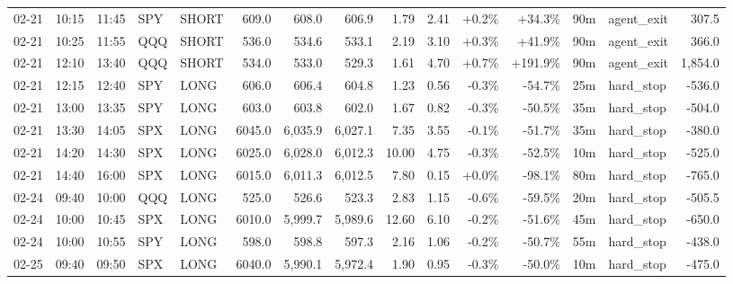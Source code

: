 \documentclass[11pt,a4paper,twoside]{article}
\begin{document}
\begin{landscape}
\begin{center}
\begin{longtable}{>{\color{txtmain}}l l l l l r r r r r r r r >{\color{txtmain}}l r}
02-21 & 10:15 & 11:45 & SPY & SHORT & 609.0 & 608.0 & 606.9 & 1.79 & 2.41 & \textcolor{wingreen}{+0.2\%} & \textcolor{wingreen}{+34.3\%} & 90m & agent\_exit & \textcolor{wingreen}{307.5} \\
02-21 & 10:25 & 11:55 & QQQ & SHORT & 536.0 & 534.6 & 533.1 & 2.19 & 3.10 & \textcolor{wingreen}{+0.3\%} & \textcolor{wingreen}{+41.9\%} & 90m & agent\_exit & \textcolor{wingreen}{366.0} \\
02-21 & 12:10 & 13:40 & QQQ & SHORT & 534.0 & 533.0 & 529.3 & 1.61 & 4.70 & \textcolor{wingreen}{+0.7\%} & \textcolor{wingreen}{+191.9\%} & 90m & agent\_exit & \textcolor{wingreen}{1,854.0} \\
02-21 & 12:15 & 12:40 & SPY & LONG & 606.0 & 606.4 & 604.8 & 1.23 & 0.56 & \textcolor{lossred}{-0.3\%} & \textcolor{lossred}{-54.7\%} & 25m & hard\_stop & \textcolor{lossred}{-536.0} \\
02-21 & 13:00 & 13:35 & SPY & LONG & 603.0 & 603.8 & 602.0 & 1.67 & 0.82 & \textcolor{lossred}{-0.3\%} & \textcolor{lossred}{-50.5\%} & 35m & hard\_stop & \textcolor{lossred}{-504.0} \\
02-21 & 13:30 & 14:05 & SPX & LONG & 6045.0 & 6,035.9 & 6,027.1 & 7.35 & 3.55 & \textcolor{lossred}{-0.1\%} & \textcolor{lossred}{-51.7\%} & 35m & hard\_stop & \textcolor{lossred}{-380.0} \\
02-21 & 14:20 & 14:30 & SPX & LONG & 6025.0 & 6,028.0 & 6,012.3 & 10.00 & 4.75 & \textcolor{lossred}{-0.3\%} & \textcolor{lossred}{-52.5\%} & 10m & hard\_stop & \textcolor{lossred}{-525.0} \\
02-21 & 14:40 & 16:00 & SPX & LONG & 6015.0 & 6,011.3 & 6,012.5 & 7.80 & 0.15 & \textcolor{wingreen}{+0.0\%} & \textcolor{lossred}{-98.1\%} & 80m & hard\_stop & \textcolor{lossred}{-765.0} \\
02-24 & 09:40 & 10:00 & QQQ & LONG & 525.0 & 526.6 & 523.3 & 2.83 & 1.15 & \textcolor{lossred}{-0.6\%} & \textcolor{lossred}{-59.5\%} & 20m & hard\_stop & \textcolor{lossred}{-505.5} \\
02-24 & 10:00 & 10:45 & SPX & LONG & 6010.0 & 5,999.7 & 5,989.6 & 12.60 & 6.10 & \textcolor{lossred}{-0.2\%} & \textcolor{lossred}{-51.6\%} & 45m & hard\_stop & \textcolor{lossred}{-650.0} \\
02-24 & 10:00 & 10:55 & SPY & LONG & 598.0 & 598.8 & 597.3 & 2.16 & 1.06 & \textcolor{lossred}{-0.2\%} & \textcolor{lossred}{-50.7\%} & 55m & hard\_stop & \textcolor{lossred}{-438.0} \\
02-25 & 09:40 & 09:50 & SPX & LONG & 6040.0 & 5,990.1 & 5,972.4 & 1.90 & 0.95 & \textcolor{lossred}{-0.3\%} & \textcolor{lossred}{-50.0\%} & 10m & hard\_stop & \textcolor{lossred}{-475.0} \\

\end{longtable}
\end{center}
\end{landscape}
\end{document}
